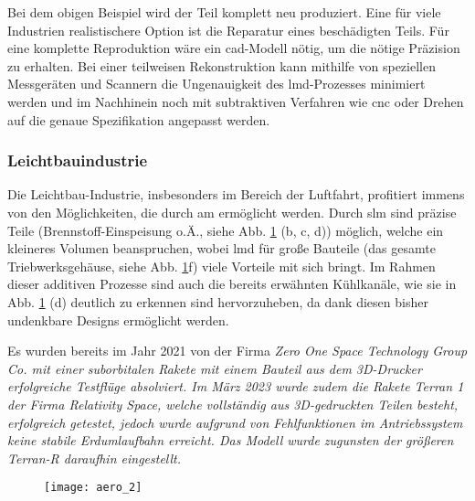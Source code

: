 \documentclass[../main.tex]{subfiles}
\begin{document}
Bei dem obigen Beispiel wird der Teil komplett neu produziert. 
Eine für viele Industrien realistischere Option ist die Reparatur eines beschädigten Teils. Für eine komplette Reproduktion wäre ein \acrshort{cad}-Modell nötig, um die nötige Präzision zu erhalten. 
Bei einer teilweisen Rekonstruktion kann mithilfe von speziellen Messgeräten und Scannern die Ungenauigkeit des \acrshort{lmd}-Prozesses minimiert werden und im Nachhinein noch mit subtraktiven Verfahren wie \acrfull{cnc} oder Drehen auf die genaue Spezifikation angepasst werden. 
\subsubsection{Leichtbauindustrie}
Die Leichtbau-Industrie, insbesonders im Bereich der Luftfahrt, profitiert immens von den Möglichkeiten, die durch \acrfull{am} ermöglicht werden. Durch \acrfull{slm} sind präzise Teile (Brennstoff-Einspeisung o.Ä., siehe Abb. \ref{img:aero_1} (b, c, d)) möglich, welche ein kleineres Volumen beanspruchen, wobei \acrfull{lmd} für große Bauteile (das gesamte Triebwerksgehäuse, siehe Abb. \ref{img:aero_1}f) viele Vorteile mit sich bringt. Im Rahmen dieser additiven Prozesse sind auch die bereits erwähnten Kühlkanäle, wie sie in Abb. \ref{img:aero_1} (d) deutlich zu erkennen sind hervorzuheben, da dank diesen bisher undenkbare Designs ermöglicht werden.

Es wurden bereits im Jahr 2021 von der Firma \it{Zero One Space Technology Group Co.} mit einer suborbitalen Rakete mit einem Bauteil aus dem 3D-Drucker erfolgreiche Testflüge absolviert. Im März 2023 wurde zudem die Rakete \it{Terran 1} der Firma \it{Relativity Space}, welche vollständig aus 3D-gedruckten Teilen besteht, erfolgreich getestet, jedoch wurde aufgrund von Fehlfunktionen im Antriebssystem keine stabile Erdumlaufbahn erreicht.\parencite{terran1_umlaufbahn} Das Modell wurde zugunsten der größeren \it{Terran-R} daraufhin eingestellt.\parencite{terran_r}


\begin{figure}[H]
	\centering
	\texttt{[image: aero\_2]}
	\label{img:aero_1}
\end{figure} 

\end{document}
